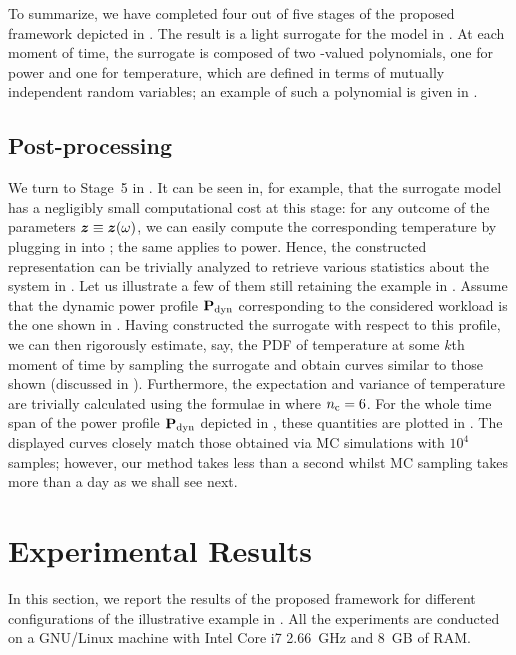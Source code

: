 To summarize, we have completed four out of five stages of the proposed
framework depicted in . The result is a light surrogate for the
model in . At each moment of time, the surrogate is
composed of two \np-valued polynomials, one for power and one for temperature,
which are defined in terms of \nz mutually independent random variables; an
example of such a polynomial is given in .

\subsection{Post-processing}

We turn to Stage~5 in . It can be seen in, for example,
 that the surrogate model has a negligibly small computational
cost at this stage: for any outcome of the parameters $\boldsymbol{z} \equiv \boldsymbol{z}(\omega)$,
we can easily compute the corresponding temperature by plugging in \vz into
; the same applies to power. Hence, the constructed
representation can be trivially analyzed to retrieve various statistics about
the system in . Let us illustrate a few of them still
retaining the example in . Assume that the dynamic power
profile $\mathbf{P}_{\mathrm{dyn}}$ corresponding to the considered workload is the one shown
in . Having constructed the surrogate with respect to
this profile, we can then rigorously estimate, say, the PDF of temperature at
some $k$th moment of time by sampling the surrogate and obtain curves similar to
those shown  (discussed in
). Furthermore, the expectation and variance of
temperature are trivially calculated using the formulae in 
where ${n_\mathrm{c}} = 6$. For the whole time span of the power profile $\mathbf{P}_{\mathrm{dyn}}$
depicted in , these quantities are plotted in
. The displayed curves closely match those
obtained via MC simulations with $10^4$ samples; however, our method takes less
than a second whilst MC sampling takes more than a day as we shall see next.

\section{Experimental Results}

In this section, we report the results of the proposed framework for different
configurations of the illustrative example in . All
the experiments are conducted on a GNU/Linux machine with Intel Core i7 2.66~GHz
and 8~GB of RAM.

